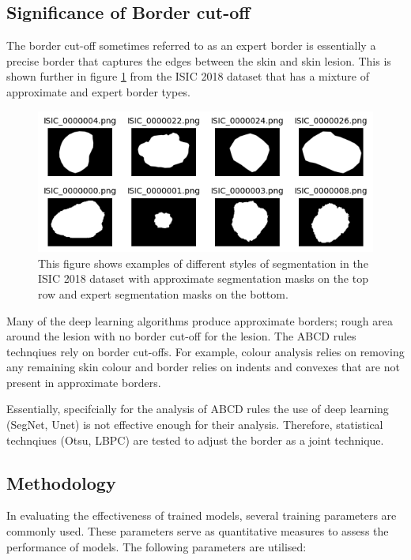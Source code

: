\subsection{Significance of Border cut-off}
The border cut-off sometimes referred to as an expert border is essentially a precise border that captures the edges between the skin and skin lesion. This is shown further in figure \ref{seg-expert} from the ISIC 2018 dataset that has a mixture of approximate and expert border types. 

\begin{figure}[]
    \centering
    \includegraphics[scale=0.9]{images/segmentation/seg-expert-approx.png}
    \caption{This figure shows examples of different styles of segmentation in the ISIC 2018 dataset with approximate segmentation masks on the top row and expert segmentation masks on the bottom.}\label{seg-expert}
\end{figure}

Many of the deep learning algorithms produce approximate borders; rough area around the lesion with no border cut-off for the lesion. The ABCD rules technqiues rely on border cut-offs. For example, colour analysis relies on removing any remaining skin colour and border relies on indents and convexes that are not present in approximate borders.

Essentially, specifcially for the analysis of ABCD rules the use of deep learning (SegNet, Unet) is not effective enough for their analysis. Therefore, statistical technqiues (Otsu, LBPC) are tested to adjust the border as a joint technique.

\subsection{Methodology}

In evaluating the effectiveness of trained models, several training parameters are commonly used. These parameters serve as quantitative measures to assess the performance of models. The following parameters are utilised:

